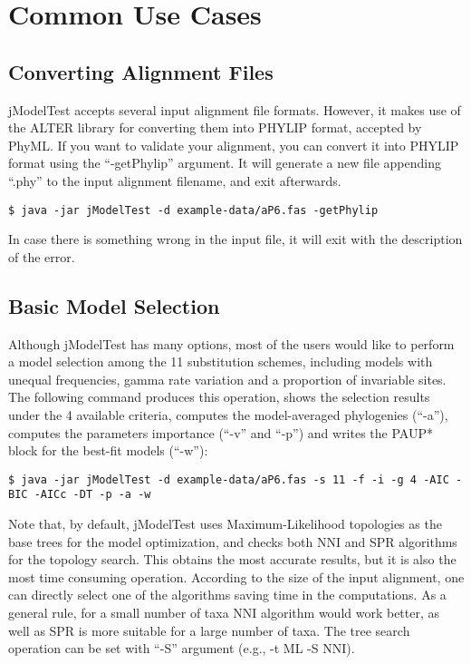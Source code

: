\documentclass[10pt,twoside,a4paper]{article}
\begin{document}
\section{Common Use Cases}

\subsection{Converting Alignment Files}

jModelTest accepts several input alignment file formats. However, it makes use of the ALTER library for converting them into PHYLIP format, accepted by PhyML. If you want to validate your alignment, you can convert it into PHYLIP format using the ``-getPhylip'' argument. It will generate a new file appending ``.phy'' to the input alignment filename, and exit afterwards.

\begin{lstlisting}
$ java -jar jModelTest -d example-data/aP6.fas -getPhylip
\end{lstlisting}

In case there is something wrong in the input file, it will exit with the description of the error.

\subsection{Basic Model Selection}

Although jModelTest has many options, most of the users would like to perform a model selection among the 11 substitution schemes, including models with unequal frequencies, gamma rate variation and a proportion of invariable sites. The following command produces this operation, shows the selection results under the 4 available criteria, computes the model-averaged phylogenies (``-a''), computes the parameters importance (``-v'' and ``-p'') and writes the PAUP* block for the best-fit models (``-w''):

\begin{lstlisting}
$ java -jar jModelTest -d example-data/aP6.fas -s 11 -f -i -g 4 -AIC -BIC -AICc -DT -p -a -w
\end{lstlisting}

Note that, by default, jModelTest uses Maximum-Likelihood topologies as the base trees for the model optimization, and checks both NNI and SPR algorithms for the topology search. This obtains the most accurate results, but it is also the most time consuming operation. According to the size of the input alignment, one can directly select one of the algorithms saving time in the computations. As a general rule, for a small number of taxa NNI algorithm would work better, as well as SPR is more suitable for a large number of taxa. The tree search operation can be set with ``-S'' argument (e.g., -t ML -S NNI).
\end{document}
